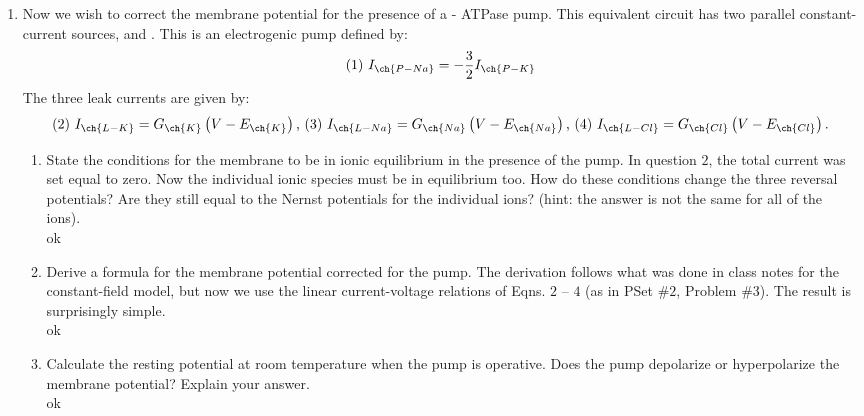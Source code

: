 \documentclass[11pt]{article}
\begin{document}
\begin{enumerate}[label=\arabic*.]
\newpage
\item
Now we wish to correct the membrane potential for the presence of a - ATPase pump. This equivalent circuit has two parallel constant-current sources,  and . This is an electrogenic pump defined by:
\begin{align*}
\text{(1) } I_{\ch{P - Na}} = - \frac{3} {2} I_{\ch{P - K}}
\end{align*}
The three leak currents are given by:
\begin{align*}
\text{(2) } I_{\ch{L - K}} = G_{\ch{K}} \left(V - E_{\ch{K}}\right) \text{, (3) } I_{\ch{L - Na}} = G_{\ch{Na}} \left(V - E_{\ch{Na}}\right) \text{, (4) } I_{\ch{L - Cl}} = G_{\ch{Cl}} \left(V - E_{\ch{Cl}}\right).
\end{align*}
\begin{enumerate}[label=(\alph*)]
\item
State the conditions for the membrane to be in ionic equilibrium in the presence of the pump. In question $2$, the total current was set equal to zero. Now the individual ionic species must be in equilibrium too. How do these conditions change the three reversal potentials? Are they still equal to the Nernst potentials for the individual ions? (hint: the answer is not the same for all of the ions).
\vspace*{1\baselineskip}
\\
ok







\vspace*{1\baselineskip}
\item
Derive a formula for the membrane potential corrected for the pump. The derivation follows what was done in class notes for the constant-field model, but now we use the linear current-voltage relations of Eqns. $2$ – $4$ (as in PSet \#$2$, Problem \#$3$). The result is surprisingly simple.
\vspace*{1\baselineskip}
\\
ok









\vspace*{1\baselineskip}
\item
Calculate the resting potential at room temperature when the pump is operative. Does the pump depolarize or hyperpolarize the membrane potential? Explain your answer.
\vspace*{1\baselineskip}
\\
ok









\end{enumerate}
\end{enumerate}
\end{document}
